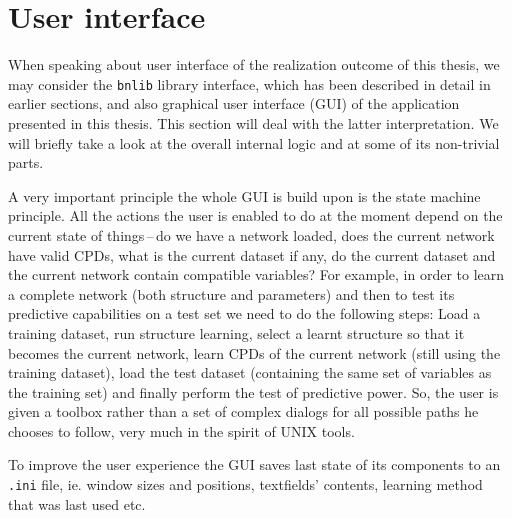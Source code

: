 \documentclass[english,cover]{fitthesis} %
\newcommand{\srccode}[1]{{\tt #1}}         %
\begin{document}
\section{User interface}
When speaking about user interface of the realization outcome of this thesis, we may consider the \srccode{bnlib} library interface, which has been described in detail in earlier sections, and also graphical user interface (GUI) of the application presented in this thesis. This section will deal with the latter interpretation. We will briefly take a look at the overall internal logic and at some of its non-trivial parts.

A very important principle the whole GUI is build upon is the state machine principle. All the actions the user is enabled to do at the moment depend on the current state of things\,--\,do we have a network loaded, does the current network have valid CPDs, what is the current dataset if any, do the current dataset and the current network contain compatible variables? For example, in order to learn a complete network (both structure and parameters) and then to test its predictive capabilities on a test set we need to do the following steps: Load a training dataset, run structure learning, select a learnt structure so that it becomes the current network, learn CPDs of the current network (still using the training dataset), load the test dataset (containing the same set of variables as the training set) and finally perform the test of predictive power. So, the user is given a toolbox rather than a set of complex dialogs for all possible paths he chooses to follow, very much in the spirit of UNIX tools.

To improve the user experience the GUI saves last state of its components to an \srccode{.ini} file, ie. window sizes and positions, textfields' contents, learning method that was last used etc.
\end{document}
